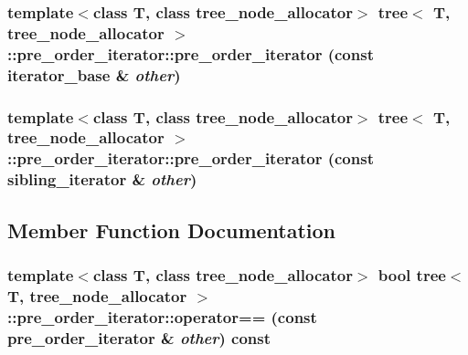 \hypertarget{classtree_1_1pre__order__iterator_969cfeb31a2e92d1a64d9f2945bbedf7}{
\subsubsection{\setlength{\rightskip}{0pt plus 5cm}template$<$class T, class tree\_\-node\_\-allocator$>$ {\bf tree}$<$ T, tree\_\-node\_\-allocator $>$::pre\_\-order\_\-iterator::pre\_\-order\_\-iterator (const {\bf iterator\_\-base} \& {\em other})}}
\label{classtree_1_1pre__order__iterator_969cfeb31a2e92d1a64d9f2945bbedf7}


\hypertarget{classtree_1_1pre__order__iterator_2705495c89beecc86107ca742a35507f}{
\subsubsection{\setlength{\rightskip}{0pt plus 5cm}template$<$class T, class tree\_\-node\_\-allocator$>$ {\bf tree}$<$ T, tree\_\-node\_\-allocator $>$::pre\_\-order\_\-iterator::pre\_\-order\_\-iterator (const {\bf sibling\_\-iterator} \& {\em other})}}
\label{classtree_1_1pre__order__iterator_2705495c89beecc86107ca742a35507f}




\subsection{Member Function Documentation}
\hypertarget{classtree_1_1pre__order__iterator_ea8dee1bfc2450608b2b35d26a9f11b7}{
\subsubsection{\setlength{\rightskip}{0pt plus 5cm}template$<$class T, class tree\_\-node\_\-allocator$>$ bool {\bf tree}$<$ T, tree\_\-node\_\-allocator $>$::pre\_\-order\_\-iterator::operator== (const {\bf pre\_\-order\_\-iterator} \& {\em other}) const}}
\label{classtree_1_1pre__order__iterator_ea8dee1bfc2450608b2b35d26a9f11b7}


